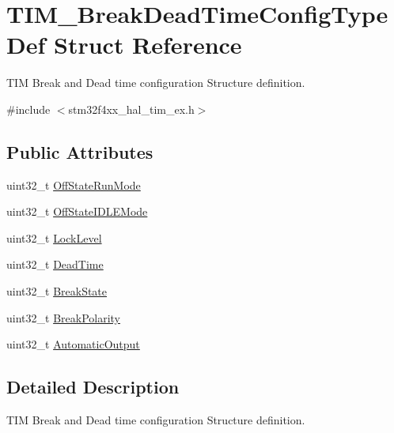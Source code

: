 \hypertarget{struct_t_i_m___break_dead_time_config_type_def}{}\section{T\+I\+M\+\_\+\+Break\+Dead\+Time\+Config\+Type\+Def Struct Reference}
\label{struct_t_i_m___break_dead_time_config_type_def}


T\+IM Break and Dead time configuration Structure definition.  




{\ttfamily \#include $<$stm32f4xx\+\_\+hal\+\_\+tim\+\_\+ex.\+h$>$}

\subsection*{Public Attributes}
\begin{DoxyCompactItemize}
\item 
uint32\+\_\+t \hyperlink{struct_t_i_m___break_dead_time_config_type_def_a5e97751b5e397414e2a5120eb5cef7c6}{Off\+State\+Run\+Mode}
\item 
uint32\+\_\+t \hyperlink{struct_t_i_m___break_dead_time_config_type_def_a49f39e31ac019b9b7a20751bfd01c6c4}{Off\+State\+I\+D\+L\+E\+Mode}
\item 
uint32\+\_\+t \hyperlink{struct_t_i_m___break_dead_time_config_type_def_ab00ae9fa5c6daa6319883863dee6e40a}{Lock\+Level}
\item 
uint32\+\_\+t \hyperlink{struct_t_i_m___break_dead_time_config_type_def_a4bdc5aec84be4b728b55028491f261d4}{Dead\+Time}
\item 
uint32\+\_\+t \hyperlink{struct_t_i_m___break_dead_time_config_type_def_a8962430194b43ac28a14c96dd9cc44e6}{Break\+State}
\item 
uint32\+\_\+t \hyperlink{struct_t_i_m___break_dead_time_config_type_def_ae15ddbf3087f9a2129a52a1317339ea7}{Break\+Polarity}
\item 
uint32\+\_\+t \hyperlink{struct_t_i_m___break_dead_time_config_type_def_ae591f2368d0be5b77d8a746e73eabe71}{Automatic\+Output}
\end{DoxyCompactItemize}


\subsection{Detailed Description}
T\+IM Break and Dead time configuration Structure definition. 

